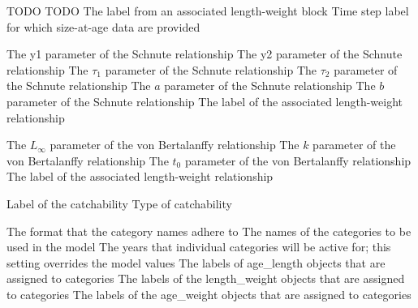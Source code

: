 \par\textbf{}\par
{} {TODO}
 {TODO}
 {The label from an associated length-weight block}
 {Time step label for which size-at-age data are provided}

\par\textbf{}\par
\par\textbf{}\par
{} {The y1 parameter of the Schnute relationship}
 {The y2 parameter of the Schnute relationship}
 {The $\tau_1$ parameter of the Schnute relationship}
 {The $\tau_2$ parameter of the Schnute relationship}
 {The $a$ parameter of the Schnute relationship}
 {The $b$ parameter of the Schnute relationship}
 {The label of the associated length-weight relationship}

\par\textbf{}\par
{} {The $L_{\infty}$ parameter of the von Bertalanffy relationship}
 {The $k$ parameter of the von Bertalanffy relationship}
 {The $t_0$ parameter of the von Bertalanffy relationship}
 {The label of the associated length-weight relationship}

\par\par
{} {Label of the catchability}
 {Type of catchability}

\par\par
{} {The format that the category names adhere to}
 {The names of the categories to be used in the model}
 {The years that individual categories will be active for; this setting overrides the model values}
 {The labels of age\_length objects that are assigned to categories}
 {The labels of the length\_weight objects that are assigned to categories}
 {The labels of the age\_weight objects that are assigned to categories}

